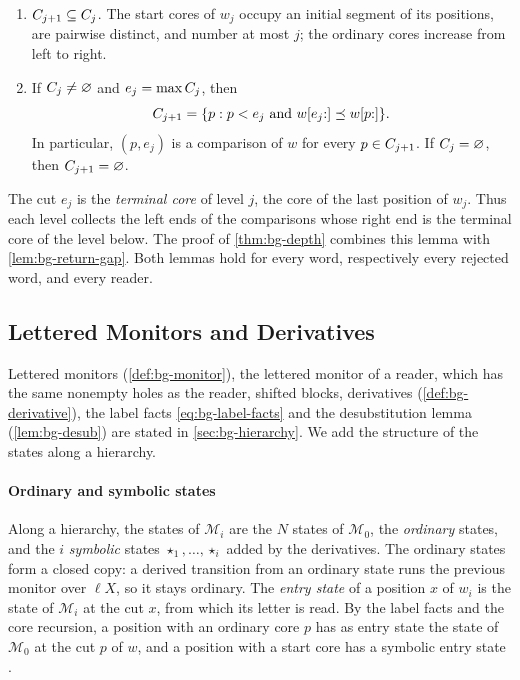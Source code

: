 \begin{lemma}\label{lem:bg-cores}
\leavevmode
\begin{enumerate}[leftmargin=*]
\item $C_{j+1}\subseteq C_j$. The start cores of $w_j$ occupy an
  initial segment of its positions, are pairwise distinct, and number at most
  $j$; the ordinary cores increase from left to right.
\item If $C_j\ne\varnothing$ and $e_j=\max C_j$, then
  \[
   C_{j+1}=\{p : p<e_j\text{ and }w[e_j{:}]\preceq w[p{:}]\}.
  \]
  In particular, $(p,e_j)$ is a comparison of $w$ for every
  $p\in C_{j+1}$. If $C_j=\varnothing$, then
  $C_{j+1}=\varnothing$.
\end{enumerate}
\end{lemma}

The cut $e_j$ is the \emph{terminal core} of level $j$, the core of the last
position of $w_j$. Thus each level collects the left ends of the comparisons
whose right end is the terminal core of the level below. The proof of
\cref{thm:bg-depth} combines this lemma with \cref{lem:bg-return-gap}. Both
lemmas hold for every word, respectively every rejected word, and every reader.

\subsection{Lettered Monitors and Derivatives}\label{app:bg-monitors}

Lettered monitors (\cref{def:bg-monitor}), the lettered monitor of a reader,
which has the same nonempty holes as the reader, shifted blocks, derivatives
(\cref{def:bg-derivative}), the label facts \cref{eq:bg-label-facts} and the
desubstitution lemma (\cref{lem:bg-desub}) are stated in
\cref{sec:bg-hierarchy}. We add the structure of the states along a
hierarchy.

\paragraph{Ordinary and symbolic states}
Along a hierarchy, the states of $\mathcal M_i$ are the $N$ states of
$\mathcal M_0$, the \emph{ordinary} states, and the $i$ \emph{symbolic} states
$\star_1,\ldots,\star_i$ added by the derivatives. The ordinary states form a
closed copy: a derived transition from an ordinary state runs the previous
monitor over $\ell X$, so it stays ordinary. The \emph{entry state} of a
position $x$ of $w_i$ is the state of $\mathcal M_i$ at the cut $x$, from which
its letter is read. By the label facts and the core recursion, a position with
an ordinary core $p$ has as entry state the state of $\mathcal M_0$ at the cut
$p$ of $w$, and a position with a start core has a symbolic entry state
.

